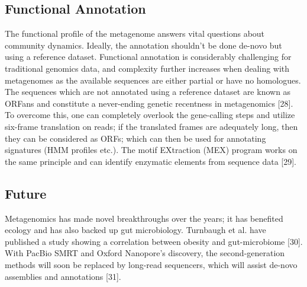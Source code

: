 \subsection{Functional Annotation}
The functional profile of the metagenome answers vital questions about community dynamics. Ideally, the annotation shouldn't be done de-novo but using a reference dataset. Functional annotation is considerably challenging for traditional genomics data, and complexity further increases when dealing with metagenomes as the available sequences are either partial or have no homologues. The sequences which are not annotated using a reference dataset are known as ORFans and constitute a never-ending genetic recentness in metagenomics [28]. To overcome this, one can completely overlook the gene-calling steps and utilize six-frame translation on reads; if the translated frames are adequately long, then they can be considered as ORFs; which can then be used for annotating signatures (HMM profiles etc.). The motif EXtraction (MEX) program works on the same principle and can identify enzymatic elements from sequence data [29].

\subsection{Future}
Metagenomics has made novel breakthroughs over the years; it has benefited ecology and has also backed up gut microbiology. Turnbaugh et al. have published a study showing a correlation between obesity and gut-microbiome [30]. With PacBio SMRT and Oxford Nanopore's discovery, the second-generation methods will soon be replaced by long-read sequencers, which will assist de-novo assemblies and annotations [31].